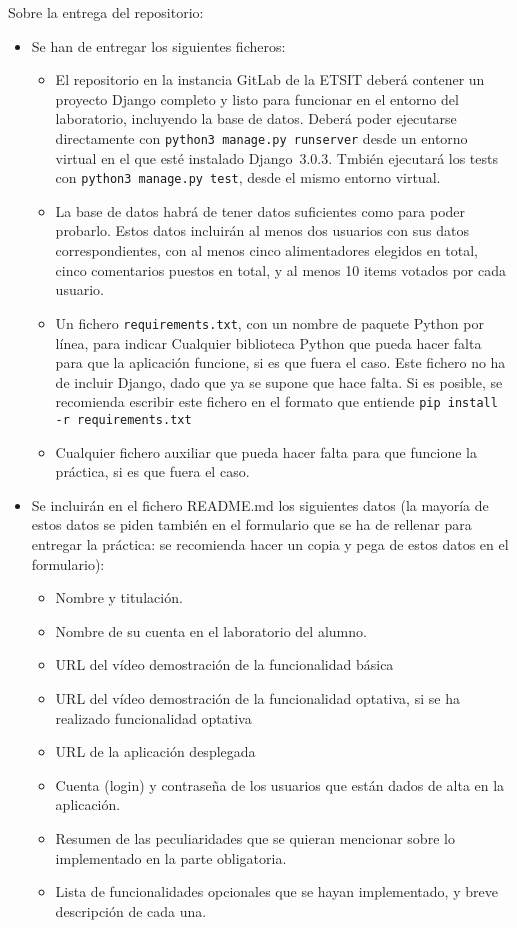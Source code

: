 Sobre la entrega del repositorio:
\begin{itemize}
  \item Se han de entregar los siguientes ficheros:

\begin{itemize}
  \item El repositorio en la instancia GitLab de la ETSIT deberá contener un proyecto Django completo y listo para funcionar en el entorno del laboratorio, incluyendo la base de datos. Deberá poder ejecutarse directamente con \verb|python3 manage.py runserver| desde un entorno virtual en el que esté instalado Django~3.0.3. Tmbién ejecutará los tests con \verb|python3 manage.py test|, desde el mismo entorno virtual.

  \item La base de datos habrá de tener datos suficientes como para poder probarlo. Estos datos incluirán al menos dos usuarios con sus datos correspondientes, con al menos cinco alimentadores elegidos en total, cinco comentarios puestos en total, y al menos 10 items votados por cada usuario.

  \item Un fichero \verb|requirements.txt|, con un nombre de paquete Python por línea, para indicar Cualquier biblioteca Python que pueda hacer falta para que la aplicación funcione, si es que fuera el caso. Este fichero no ha de incluir Django, dado que ya se supone que hace falta. Si es posible, se recomienda escribir este fichero en el formato que entiende \verb|pip install -r requirements.txt|

  \item Cualquier fichero auxiliar que pueda hacer falta para que funcione la práctica, si es que fuera el caso.
\end{itemize}

  \item Se incluirán en el fichero README.md los siguientes datos (la mayoría de estos datos se piden también en el formulario que se ha de rellenar para entregar la práctica: se recomienda hacer un copia y pega de estos datos en el formulario):

\begin{itemize}
  \item Nombre y titulación.
  \item Nombre de su cuenta en el laboratorio del alumno.
  \item URL del vídeo demostración de la funcionalidad básica
  \item URL del vídeo demostración de la funcionalidad optativa, si se ha realizado funcionalidad optativa
  \item URL de la aplicación desplegada
  \item Cuenta (login) y contraseña de los usuarios que están dados de alta en la aplicación.
  \item Resumen de las peculiaridades que se quieran mencionar sobre lo implementado en la parte obligatoria.
  \item Lista de funcionalidades opcionales que se hayan implementado, y breve descripción de cada una.
\end{itemize}


\end{itemize}
